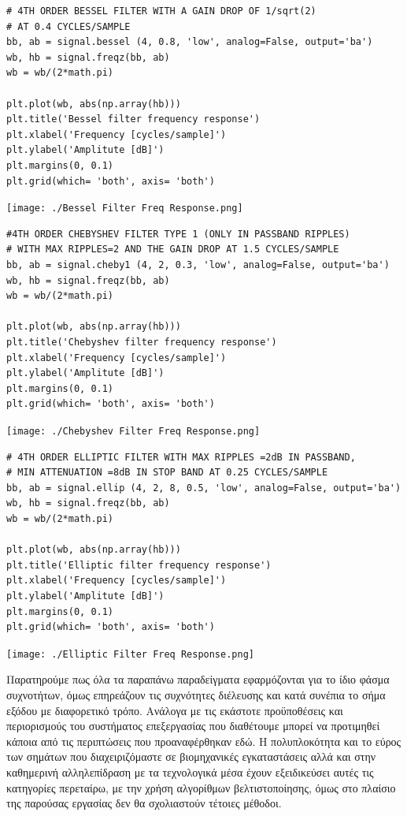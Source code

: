\documentclass[breaklines=true, 12pt]{article}
\begin{document}
\begin{verbatim}
# 4TH ORDER BESSEL FILTER WITH A GAIN DROP OF 1/sqrt(2)
# AT 0.4 CYCLES/SAMPLE
bb, ab = signal.bessel (4, 0.8, 'low', analog=False, output='ba')
wb, hb = signal.freqz(bb, ab)
wb = wb/(2*math.pi)

plt.plot(wb, abs(np.array(hb)))
plt.title('Bessel filter frequency response')
plt.xlabel('Frequency [cycles/sample]')
plt.ylabel('Amplitute [dB]')
plt.margins(0, 0.1)
plt.grid(which= 'both', axis= 'both')
\end{verbatim}

\begin{center}
\texttt{[image: ./Bessel Filter Freq Response.png]}
\end{center}

\begin{verbatim}
#4TH ORDER CHEBYSHEV FILTER TYPE 1 (ONLY IN PASSBAND RIPPLES)
# WITH MAX RIPPLES=2 AND THE GAIN DROP AT 1.5 CYCLES/SAMPLE
bb, ab = signal.cheby1 (4, 2, 0.3, 'low', analog=False, output='ba')
wb, hb = signal.freqz(bb, ab)
wb = wb/(2*math.pi)

plt.plot(wb, abs(np.array(hb)))
plt.title('Chebyshev filter frequency response')
plt.xlabel('Frequency [cycles/sample]')
plt.ylabel('Amplitute [dB]')
plt.margins(0, 0.1)
plt.grid(which= 'both', axis= 'both')
\end{verbatim}

\begin{center}
\texttt{[image: ./Chebyshev Filter Freq Response.png]}
\end{center}

\begin{verbatim}
# 4TH ORDER ELLIPTIC FILTER WITH MAX RIPPLES =2dB IN PASSBAND,
# MIN ATTENUATION =8dB IN STOP BAND AT 0.25 CYCLES/SAMPLE
bb, ab = signal.ellip (4, 2, 8, 0.5, 'low', analog=False, output='ba')
wb, hb = signal.freqz(bb, ab)
wb = wb/(2*math.pi)

plt.plot(wb, abs(np.array(hb)))
plt.title('Elliptic filter frequency response')
plt.xlabel('Frequency [cycles/sample]')
plt.ylabel('Amplitute [dB]')
plt.margins(0, 0.1)
plt.grid(which= 'both', axis= 'both')
\end{verbatim}

\begin{center}
\texttt{[image: ./Elliptic Filter Freq Response.png]}
\end{center}

Παρατηρούμε πως όλα τα παραπάνω παραδείγματα εφαρμόζονται για το ίδιο φάσμα
συχνοτήτων, όμως επηρεάζουν τις συχνότητες διέλευσης και κατά συνέπια το
σήμα εξόδου με διαφορετικό τρόπο. Ανάλογα με τις εκάστοτε προϋποθέσεις και
περιορισμούς του συστήματος επεξεργασίας που διαθέτουμε μπορεί να προτιμηθεί
κάποια από τις περιπτώσεις που προαναφέρθηκαν εδώ. Η πολυπλοκότητα και το εύρος
των σημάτων που διαχειριζόμαστε σε βιομηχανικές εγκαταστάσεις αλλά και στην
καθημερινή αλληλεπίδραση με τα τεχνολογικά μέσα έχουν εξειδικεύσει αυτές τις
κατηγορίες περεταίρω, με την χρήση αλγορίθμων βελτιστοποίησης, όμως στο πλαίσιο
της παρούσας εργασίας δεν θα σχολιαστούν τέτοιες μέθοδοι.
\end{document}
